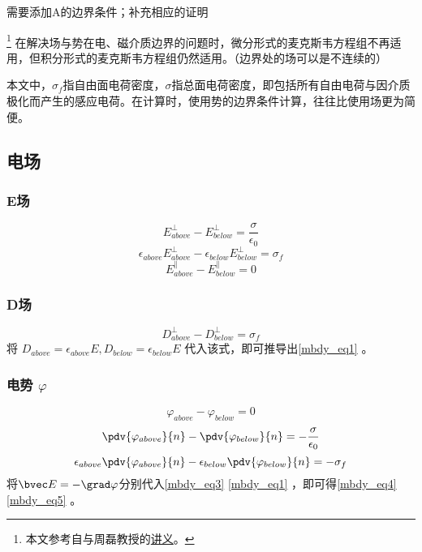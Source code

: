 
\begin{issues}
\issueTODO 需要添加A的边界条件；补充相应的证明
\end{issues}

\footnote{本文参考自\cite{GriffE}与周磊教授的\href{http://fdjpkc.fudan.edu.cn/d200927/2009/0314/c8569a14801/page.htm}{讲义}。}
在解决场与势在电、磁介质边界的问题时，微分形式的麦克斯韦方程组不再适用，但积分形式的麦克斯韦方程组仍然适用。（边界处的场可以是不连续的）

本文中，$\sigma_f$指自由面电荷密度，$\sigma$指总面电荷密度，即包括所有自由电荷与因介质极化而产生的感应电荷。在计算时，使用势的边界条件计算，往往比使用场更为简便。

\subsection{电场}

\subsubsection{E场}
\begin{equation}\label{mbdy_eq3}
E^\perp_{above} - E^\perp_{below} = \frac{\sigma}{\epsilon_0}
\end{equation}
\begin{equation}\label{mbdy_eq1}
\epsilon_{above}E^\perp_{above} - \epsilon_{below}E^\perp_{below} = \sigma_f
\end{equation}
\begin{equation}\label{mbdy_eq7}
E^\parallel_{above} - E^\parallel_{below} = 0
\end{equation}

\subsubsection{D场}
\begin{equation}\label{mbdy_eq6}
D^\perp_{above} - D^\perp_{below} = \sigma_f
\end{equation}
将 $D_{above}=\epsilon_{above} E, D_{below}=\epsilon_{below} E$ 代入该式，即可推导出\autoref{mbdy_eq1} 。

\subsubsection{电势 $\varphi$}
\begin{equation}
\varphi_{above}-\varphi_{below}=0
\end{equation}
\begin{equation}\label{mbdy_eq4}
\pdv{\varphi_{above}}{n} - \pdv{\varphi_{below}}{n}  = -\frac{\sigma}{\epsilon_0}
\end{equation}
\begin{equation}\label{mbdy_eq5}
\epsilon_{above}\pdv{\varphi_{above}}{n} - \epsilon_{below}\pdv{\varphi_{below}}{n}  = -\sigma_f
\end{equation}
将$\bvec E= -\grad \varphi$分别代入\autoref{mbdy_eq3} \autoref{mbdy_eq1} ，即可得\autoref{mbdy_eq4} \autoref{mbdy_eq5} 。


